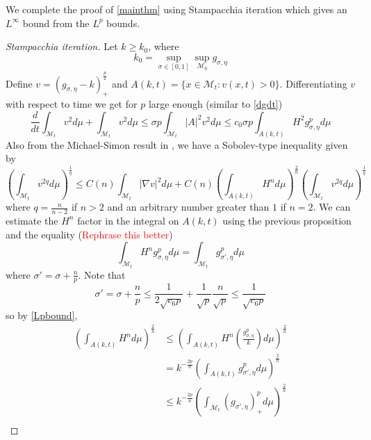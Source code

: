     We complete the proof of \cref{mainthm} using Stampacchia iteration which gives an $ L^{\infty} $ bound from the $ L^{p} $ bounds.
    \vspace{1pt}
    \begin{proof}
        [Stampacchia iteration]

         Let $ k \ge k_{0} $, where $$ k_{0} = \sup_{\sigma \in [0,1]} \sup_{\mathcal{M}_{0}} g_{\sigma, \eta} $$
        Define $ v = (g_{\sigma,\eta} - k)_{+}^{\frac{p}{2}} $ and $ A(k,t) = \{x \in \mathcal{M}_{t} : v(x,t)>0\} $. Differentiating $ v $ with respect to time we get for $ p $ large enough (similar to \cref{dgdt})
        \begin{equation}
            \frac{d}{dt} \int_{\mathcal{M}_{t}}v^{2} d \mu + \int_{\mathcal{M}_{t}} v^{2} d \mu \le \sigma p \int_{\mathcal{M}_{t}} |A|^{2}v^{2} d \mu \le c_{0} \sigma p \int_{A(k,t)}H^{2}g_{\sigma, \eta}^{p} d \mu \label{vestimate}
        \end{equation}
        Also from the Michael-Simon result in \cite{https://doi.org/10.1002/cpa.3160260305}, we have a Sobolev-type inequality given by 
        \begin{equation}
            \left( \int_{\mathcal{M}_{t}}v^{2q} d \mu \right)^{\frac{1}{q}} \le C(n) \int_{\mathcal{M}_{t}} |\nabla v|^{2} d \mu +C(n)\left( \int_{A(k,t)}H^{n}d \mu \right)^{\frac{2}{n}}\left( \int_{\mathcal{M}_{t}}v^{2q} d \mu \right)^{\frac{1}{q}} \label{MS}
        \end{equation}
        where $ q = \frac{n}{n-2}$ if $ n >2 $ and an arbitrary number greater than $ 1 $ if $ n=2 $. We can estimate the $ H^{n} $ factor in the integral on $ A(k,t) $ using the previous proposition and the equality (\textcolor{red}{Rephrase this better})
        \[ \int_{\mathcal{M}_{t}} H^{n} g_{\sigma, \eta}^{p}d \mu = \int_{\mathcal{M}_{t}}g_{\sigma', \eta}^{p} d \mu \]
        where $ \sigma' = \sigma + \frac{n}{p} $. Note that 
        \[ \sigma' = \sigma + \frac{n}{p} \le \frac{1}{2\sqrt{c_{6}p}} + \frac{1}{\sqrt{p}} \frac{n}{\sqrt{p}} \le \frac{1}{\sqrt{c_{6}p}} \] 
        so by \cref{Lpbound}, \begin{align*}
            \left( \int_{A(k,t)} H^{n} d \mu \right)^{\frac{2}{n}} &\le \left( \int_{A(k,t)}H^{n} \left(\frac{g_{\sigma, \eta}^{p}}{k}\right) d \mu \right)^{\frac{2}{n}} \\
            & = k^{-\frac{2p}{n}} \left( \int_{A(k,t)}g_{\sigma',\eta}^{p}d \mu \right)^{\frac{2}{n}} \\
            & \le k^{-\frac{2p}{n}} \left( \int_{\mathcal{M}_{t}} (g_{\sigma',\eta})_{+}^{p} d \mu\right)^{\frac{2}{n}} \\

\end{align*}
\end{proof}

